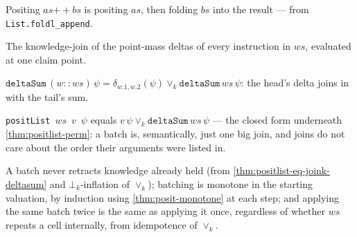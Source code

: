 \begin{proposition}\label{thm:positlist-append}\leanok{}
Positing \(as \mathbin{{+}\!\!+} bs\) is positing \(as\), then folding \(bs\)
into the result --- from \texttt{List.foldl\_append}.
\end{proposition}

\begin{definition}\label{thm:deltasum}\leanok{}
The knowledge-join of the point-mass deltas of every instruction in \(ws\),
evaluated at one claim point.
\end{definition}

\begin{proposition}\label{thm:deltasum-cons}\leanok{}
\(\texttt{deltaSum}\,(w :: ws)\,\psi = \delta_{w.1,w.2}(\psi) \vee_k
\texttt{deltaSum}\,ws\,\psi\): the head's delta joins in with the tail's sum.
\end{proposition}

\begin{theorem}\label{thm:positlist-eq-joink-deltasum}\leanok{}
\texttt{positList}~\(ws\)~\(v\)~\(\psi\) equals \(v\,\psi \vee_k
\texttt{deltaSum}\,ws\,\psi\) --- the closed form underneath
\cref{thm:positlist-perm}: a batch is, semantically, just one big join, and
joins do not care about the order their arguments were listed in.
\end{theorem}

\begin{theorem}\label{thm:positlist-lifts}\leanok{}
A batch never retracts knowledge already held (from
\cref{thm:positlist-eq-joink-deltasum} and \(\bot_k\)-inflation of
\(\vee_k\)); batching is monotone in the starting valuation, by induction
using \cref{thm:posit-monotone} at each step; and applying the same batch
twice is the same as applying it once, regardless of whether \(ws\) repeats
a cell internally, from idempotence of \(\vee_k\).
\end{theorem}
